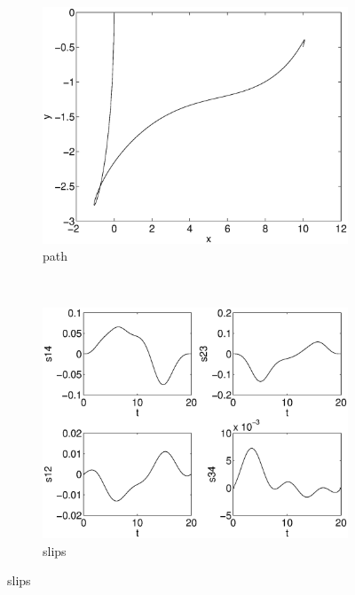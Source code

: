 \begin{figure}
\begin{subfigure}[b]{0.45\textwidth}
\centering
\includegraphics[width=\textwidth]{img/manip_pltf_task_path.eps}
\caption{path}
\end{subfigure}
~
\begin{subfigure}[b]{0.45\textwidth}
\centering
\includegraphics[width=\textwidth]{img/manip_pltf_task_slips.eps}
\caption{slips}
\end{subfigure}


\end{figure}
